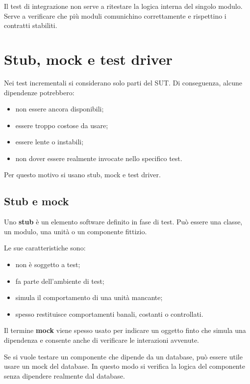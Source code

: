 \begin{notaesame}
Il test di integrazione non serve a ritestare la logica interna del singolo modulo. Serve a verificare che più moduli comunichino correttamente e rispettino i contratti stabiliti.
\end{notaesame}

\section{Stub, mock e test driver}

Nei test incrementali si considerano solo parti del SUT. Di conseguenza, alcune dipendenze potrebbero:

\begin{itemize}
    \item non essere ancora disponibili;
    \item essere troppo costose da usare;
    \item essere lente o instabili;
    \item non dover essere realmente invocate nello specifico test.
\end{itemize}

Per questo motivo si usano stub, mock e test driver.

\subsection{Stub e mock}

Uno \textbf{stub} è un elemento software definito in fase di test. Può essere una classe, un modulo, una unità o un componente fittizio.

Le sue caratteristiche sono:

\begin{itemize}
    \item non è soggetto a test;
    \item fa parte dell'ambiente di test;
    \item simula il comportamento di una unità mancante;
    \item spesso restituisce comportamenti banali, costanti o controllati.
\end{itemize}

Il termine \textbf{mock} viene spesso usato per indicare un oggetto finto che simula una dipendenza e consente anche di verificare le interazioni avvenute.

\begin{notaprof}
Se si vuole testare un componente che dipende da un database, può essere utile usare un mock del database. In questo modo si verifica la logica del componente senza dipendere realmente dal database.
\end{notaprof}

